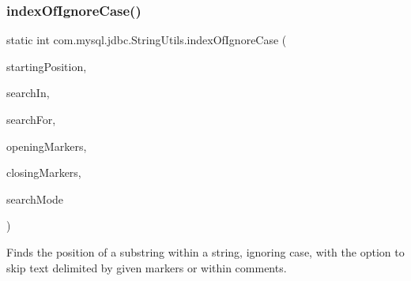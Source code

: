 \subsubsection{\texorpdfstring{index\+Of\+Ignore\+Case()}{indexOfIgnoreCase()}\hspace{0.1cm}{\footnotesize\ttfamily [4/5]}}
{\footnotesize\ttfamily static int com.\+mysql.\+jdbc.\+String\+Utils.\+index\+Of\+Ignore\+Case (\begin{DoxyParamCaption}\item[{int}]{starting\+Position,  }\item[{String}]{search\+In,  }\item[{String}]{search\+For,  }\item[{String}]{opening\+Markers,  }\item[{String}]{closing\+Markers,  }\item[{Set$<$ \mbox{\hyperlink{enumcom_1_1mysql_1_1jdbc_1_1_string_utils_1_1_search_mode}{Search\+Mode}} $>$}]{search\+Mode }\end{DoxyParamCaption})\hspace{0.3cm}{\ttfamily [static]}}

Finds the position of a substring within a string, ignoring case, with the option to skip text delimited by given markers or within comments.


